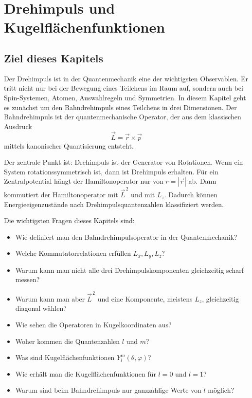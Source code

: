 \providecommand{\ket}[1]{\left|#1\right\rangle}
\providecommand{\bra}[1]{\left\langle#1\right|}
\providecommand{\braket}[2]{\left\langle#1\middle|#2\right\rangle}
\providecommand{\mel}[3]{\left\langle#1\middle|#2\middle|#3\right\rangle}
\providecommand{\dd}{\mathrm{d}}
\providecommand{\ii}{\mathrm{i}}
\providecommand{\e}{\mathrm{e}}
\providecommand{\eps}{\varepsilon}
\providecommand{\unit}{\mathbbm{1}}

\chapter{Drehimpuls und Kugelflächenfunktionen}

\section{Ziel dieses Kapitels}

Der Drehimpuls ist in der Quantenmechanik eine der wichtigsten Observablen. Er tritt nicht nur bei der Bewegung eines Teilchens im Raum auf, sondern auch bei Spin-Systemen, Atomen, Auswahlregeln und Symmetrien. In diesem Kapitel geht es zunächst um den Bahndrehimpuls eines Teilchens in drei Dimensionen. Der Bahndrehimpuls ist der quantenmechanische Operator, der aus dem klassischen Ausdruck
\[
    \vec L = \vec r \times \vec p
\]
mittels kanonischer Quantisierung entsteht.

\begin{conceptbox}
Der zentrale Punkt ist: Drehimpuls ist der Generator von Rotationen. Wenn ein System rotationssymmetrisch ist, dann ist Drehimpuls erhalten. Für ein Zentralpotential hängt der Hamiltonoperator nur von \(r=|\vec r|\) ab. Dann kommutiert der Hamiltonoperator mit \(\vec L^{\,2}\) und mit \(L_z\). Dadurch können Energieeigenzustände nach Drehimpulsquantenzahlen klassifiziert werden.
\end{conceptbox}

Die wichtigsten Fragen dieses Kapitels sind:
\begin{itemize}
    \item Wie definiert man den Bahndrehimpulsoperator in der Quantenmechanik?
    \item Welche Kommutatorrelationen erfüllen \(L_x,L_y,L_z\)?
    \item Warum kann man nicht alle drei Drehimpulskomponenten gleichzeitig scharf messen?
    \item Warum kann man aber \(\vec L^{\,2}\) und eine Komponente, meistens \(L_z\), gleichzeitig diagonal wählen?
    \item Wie sehen die Operatoren in Kugelkoordinaten aus?
    \item Woher kommen die Quantenzahlen \(l\) und \(m\)?
    \item Was sind Kugelflächenfunktionen \(Y_l^m(\theta,\varphi)\)?
    \item Wie erhält man die Kugelflächenfunktionen für \(l=0\) und \(l=1\)?
    \item Warum sind beim Bahndrehimpuls nur ganzzahlige Werte von \(l\) möglich?
\end{itemize}

